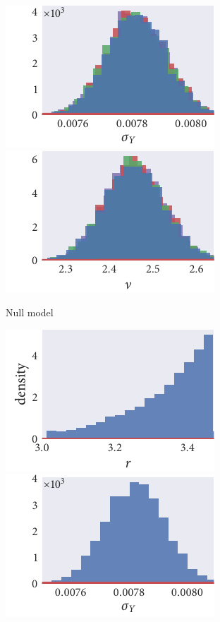 \begin{figure}[p]
  \begin{subfigure}[b]{\textwidth}
    \centering
    \includegraphics{seq3/null_hist_sigma_Y.pdf}\hspace{0.01\textwidth}
    \includegraphics{seq3/null_hist_nu.pdf}
    \caption{Null model}
  \end{subfigure}
  \begin{subfigure}[b]{\textwidth}
    \includegraphics{seq3/r_hist_r.pdf}%
    \includegraphics{seq3/r_hist_sigma_Y.pdf}%

\end{subfigure}
\end{figure}
